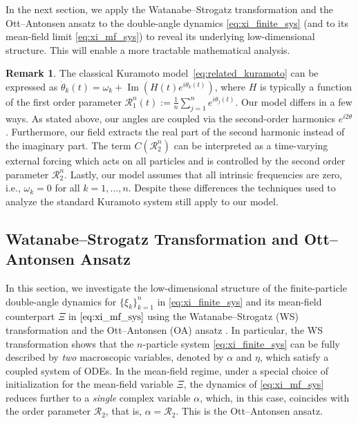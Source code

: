 \documentclass[10pt]{article}
\theoremstyle{definition}
\theoremstyle{definition}
\newtheorem{remark}[theorem]{Remark}
\numberwithin{equation}{section}
\newcommand{\CR}{\mathcal{R}}
\begin{document}
In the next section, we apply the Watanabe--Strogatz transformation \cite{watanabe_integrability} and the Ott--Antonsen ansatz \cite{ott2008low} to the double-angle dynamics \eqref{eq:xi_finite_sys} (and to its mean-field limit \eqref{eq:xi_mf_sys}) to reveal its underlying low-dimensional structure. This will enable a more tractable mathematical analysis.



\begin{remark}\label{remark:modelling}
    The classical Kuramoto model~\eqref{eq:related_kuramoto} can be expressed as $\dot \theta_k(t) = \omega_k + \operatorname{Im}({H(t)e^{i\theta_k(t)}})$, where $H$ is typically a function of the first order parameter $\mathcal{R}_1^n(t) := \frac{1}{n}\sum_{j=1}^n e^{i\theta_j(t)}$.
    Our model differs in a few ways.
    As stated above, our angles are coupled via the second-order harmonics $e^{i2\theta}$.
    Furthermore, our field extracts the real part of the second harmonic instead of the imaginary part. 
    The term $C(\mathcal{R}_2^n)$ can be interpreted as a time-varying external forcing which acts on all particles and is controlled by the second order parameter $\mathcal{R}_2^n$. Lastly, our model assumes that all intrinsic frequencies are zero, i.e., $\omega_k = 0$ for all $k=1,\dots,n$. Despite these differences the techniques used to analyze the standard Kuramoto system still apply to our model.
\end{remark}


\subsection{Watanabe--Strogatz Transformation and Ott--Antonsen Ansatz}\label{subsec:WS_OA}
In this section, we investigate the low-dimensional structure of the finite-particle double-angle dynamics for $\{\xi_k\}_{k=1}^n$ in \eqref{eq:xi_finite_sys} and its mean-field counterpart $\Xi$ in $\eqref{eq:xi_mf_sys}$ using the Watanabe--Strogatz (WS) transformation \cite{watanabe_integrability,marvel2009identical} and the Ott--Antonsen (OA) ansatz \cite{ott2008low}.
In particular, the WS transformation shows that the $n$-particle system \eqref{eq:xi_finite_sys} can be fully described by \emph{two} macroscopic variables, denoted by $\alpha$ and $\eta$, which satisfy a coupled system of ODEs.
In the mean-field regime, under a special choice of initialization for the mean-field variable $\Xi$, the dynamics of \eqref{eq:xi_mf_sys} reduces further to a \emph{single} complex variable $\alpha$, which, in this case, coincides with the order parameter $\CR_2$, that is, $\alpha = \CR_2$.
This is the Ott--Antonsen ansatz.
\end{document}
